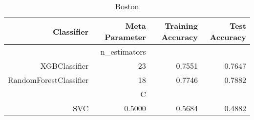 
\begin{table}[H]
    \caption{Boston}
    \centering
    \begin{tabular}{|r|r|r|r|}
        \hline
        Classifier &Meta Parameter &Training Accuracy
        &Test Accuracy\\
        \hline
        &n\_estimators &\multicolumn{2}{|r|}{}\\
        \hline
        XGBClassifier &23 &0.7551 &0.7647\\
        \hline
        RandomForestClassifier &18 &0.7746 &0.7882\\
        \hline
        &C &\multicolumn{2}{|r|}{}\\
        \hline
        SVC &0.5000 &0.5684 &0.4882\\
        \hline
    \end{tabular}
\end{table}
